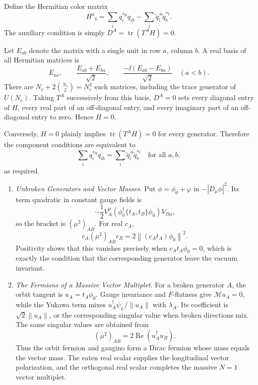 \begin{enumerate}
Define the Hermitian color matrix
  \[
    H^a{}_b
      =\sum_iq_i^{*a}q_{ib}
        -\sum_i\widetilde q_i^{\,a}\widetilde q_b^{*i}.
  \]
  The auxiliary condition is simply
  \(D^A=\operatorname{tr}(T^AH)=0\).

  Let \(E_{ab}\) denote the matrix with a single unit in row \(a\), column
  \(b\).  A real basis of all Hermitian matrices is
  \[
    E_{aa},\qquad
    \frac{E_{ab}+E_{ba}}{\sqrt2},\qquad
    \frac{-\ii(E_{ab}-E_{ba})}{\sqrt2}
    \quad (a<b).
  \]
  There are
  \(N_c+2\binom{N_c}{2}=N_c^2\) such matrices, including the trace
  generator of \(U(N_c)\).  Taking \(T^A\) successively from this basis,
  \(D^A=0\) sets every diagonal entry of \(H\), every real part of an
  off-diagonal entry, and every imaginary part of an off-diagonal entry to
  zero.  Hence \(H=0\).

  Conversely, \(H=0\) plainly implies
  \(\operatorname{tr}(T^AH)=0\) for every generator.  Therefore the
  component conditions are equivalent to
  \[
    \sum_iq_i^{*a}q_{ib}
      =\sum_i\widetilde q_i^{\,a}\widetilde q_b^{*i}
      \quad\text{for all }a,b,
  \]
  as required.

  \begin{enumerate}
    \item \emph{Unbroken Generators and Vector Masses.}
    Put \(\phi=\phi_0+\varphi\) in
      \(-|D_\mu\phi|^2\).  Its term quadratic in constant gauge fields is
      \[
        -\frac12V_A^\mu
           \left(\phi_0^\dagger\{t_A,t_B\}\phi_0\right)V_{B\mu},
      \]
      so the bracket is \((\mu^2)_{AB}\).  For real \(c_A\),
      \[
        c_A(\mu^2)_{AB}c_B
           =2\left\|\left(c_At_A\right)\phi_0\right\|^2.
      \]
      Positivity shows that this vanishes precisely when
      \(c_At_A\phi_0=0\), which is exactly the condition that the corresponding
      generator leave the vacuum invariant.
    \item \emph{The Fermions of a Massive Vector Multiplet.}
    For a broken generator \(A\), the orbit tangent is
      \(u_A=t_A\phi_0\).  Gauge invariance and \(F\)-flatness give
      \(\mathcal M u_A=0\), while the Yukawa term mixes
      \(u_A^\dagger\psi_L/\|u_A\|\) with \(\lambda_A\).  Its coefficient is
      \(\sqrt2\|u_A\|\), or the corresponding singular value when broken
      directions mix.  The same singular values are obtained from
      \[
        (\mu^2)_{AB}=2\operatorname{Re}(u_A^\dagger u_B).
      \]
      Thus the orbit fermion and gaugino form a Dirac fermion whose mass equals
      the vector mass.  The eaten real scalar supplies the longitudinal vector
      polarization, and the orthogonal real scalar completes the massive
      \(N=1\) vector multiplet.
  \end{enumerate}


\end{enumerate}
